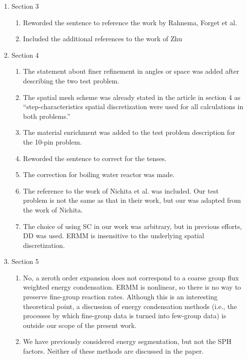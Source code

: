 \documentclass[a4paper,10pt]{article}
\begin{document}
\begin{enumerate}
    \item Section 3
    \begin{enumerate}
        \item Reworded the sentence to reference the work by Rahnema, Forget et 
        al.  
        \item Included the additional references to the work of Zhu
    \end{enumerate}
    
    \item Section 4
    \begin{enumerate}
        \item The statement about finer refinement in angles or space was added 
        after describing the two test problem.
        \item The spatial mesh scheme was already stated in the article in 
        section 4 as ``step-characteristics spatial discretization were used 
        for all calculations in both problems.''
        \item The material enrichment was added to the test problem description 
        for the 10-pin problem.
        \item Reworded the sentence to correct for the tenses.
        \item The correction for boiling water reactor was made.
        \item The reference to the work of Nichita et al. was included.  Our 
        test problem is not the same as that in their work, but our was adapted 
        from the work of Nichita.
        \item The choice of using SC in our work was arbitrary, but in previous 
        efforts, DD was used.  ERMM is insensitive to the underlying spatial 
        discretization.
    \end{enumerate}
    
    \item Section 5
    \begin{enumerate}
        \item No, a zeroth order expansion does not correspond to a coarse 
        group flux weighted energy condensation.  ERMM is nonlinear, so there is 
        no way to preserve fine-group reaction rates.  Although this is an 
        interesting theoretical point, a discussion of energy condensation 
        methods (i.e., the processes by which fine-group data is turned into 
        few-group data) is outside our scope of the present work.
        
        \item We have previously considered energy segmentation, but not the 
SPH factors.  Neither of these methods are discussed in the paper.


\end{enumerate}
\end{enumerate}
\end{document}
